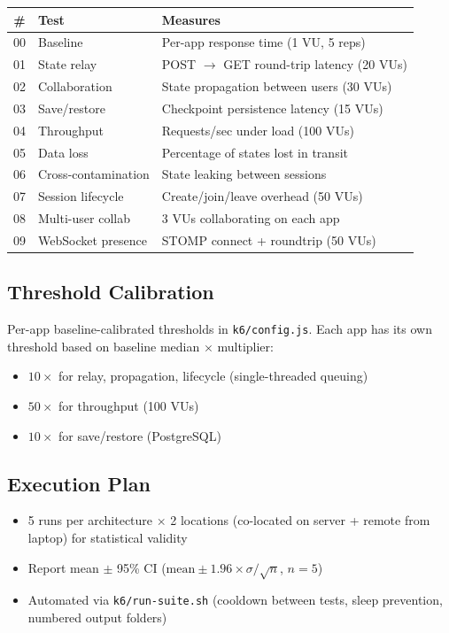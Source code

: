\documentclass[12pt,a4paper]{article}
\begin{document}
\begin{table}[h]
\centering
\small
\begin{tabular}{@{}cll@{}}
\toprule
\textbf{\#} & \textbf{Test} & \textbf{Measures} \\
\midrule
00 & Baseline           & Per-app response time (1 VU, 5 reps) \\
01 & State relay        & POST $\rightarrow$ GET round-trip latency (20 VUs) \\
02 & Collaboration      & State propagation between users (30 VUs) \\
03 & Save/restore       & Checkpoint persistence latency (15 VUs) \\
04 & Throughput          & Requests/sec under load (100 VUs) \\
05 & Data loss          & Percentage of states lost in transit \\
06 & Cross-contamination & State leaking between sessions \\
07 & Session lifecycle   & Create/join/leave overhead (50 VUs) \\
08 & Multi-user collab   & 3 VUs collaborating on each app \\
09 & WebSocket presence  & STOMP connect + roundtrip (50 VUs) \\
\bottomrule
\end{tabular}
\end{table}

\subsection{Threshold Calibration}

Per-app baseline-calibrated thresholds in \texttt{k6/config.js}. Each app has
its own threshold based on baseline median $\times$ multiplier:

\begin{itemize}[nosep]
  \item $10\times$ for relay, propagation, lifecycle (single-threaded queuing)
  \item $50\times$ for throughput (100 VUs)
  \item $10\times$ for save/restore (PostgreSQL)
\end{itemize}

\subsection{Execution Plan}

\begin{itemize}[nosep]
  \item 5 runs per architecture $\times$ 2 locations (co-located on server +
        remote from laptop) for statistical validity
  \item Report mean $\pm$ 95\% CI ($\text{mean} \pm 1.96 \times \sigma / \sqrt{n}$, $n=5$)
  \item Automated via \texttt{k6/run-suite.sh} (cooldown between tests, sleep
        prevention, numbered output folders)
\end{itemize}
\end{document}
